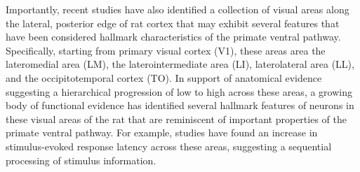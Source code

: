 Importantly, recent studies have also identified a collection of visual areas along the lateral, posterior edge of rat cortex that may exhibit several features that have been considered hallmark characteristics of the primate ventral pathway. Specifically, starting from primary visual cortex (V1), these areas area the lateromedial area (LM), the laterointermediate area (LI), laterolateral area (LL), and the occipitotemporal cortex (TO). In support of anatomical evidence suggesting a hierarchical progression of low to high across these areas\cite{Coogan1993, Wang2012NetworkCortex, DSouza2020}, a growing body of functional evidence has identified several hallmark features of neurons in these visual areas of the rat that are reminiscent of important properties of the primate ventral pathway. For example, studies have found an increase in stimulus-evoked response latency across these areas\cite{Vermaercke2014, DSouza2020}, suggesting a sequential processing of stimulus information.


